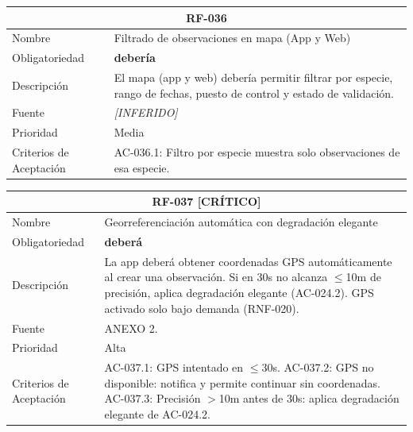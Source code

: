 \documentclass[12pt, a4paper]{article}
\newcommand{\criticomark}{\textcolor{criticolor}{\textbf{[CR\'ITICO]}}}
\newcommand{\inferido}{\textcolor{medio}{\textit{[INFERIDO]}}}
\begin{document}
\begin{longtable}{|p{3cm}|p{11.5cm}|}
\hline
\multicolumn{2}{|c|}{\textbf{RF-036}} \\
\hline
Nombre & Filtrado de observaciones en mapa (App y Web) \\
\hline
Obligatoriedad & \textbf{deber\'ia} \\
\hline
Descripci\'on & El mapa (app y web) deber\'ia permitir filtrar por especie, rango de fechas, puesto de control y estado de validaci\'on. \\
\hline
Fuente & \inferido{} \\
\hline
Prioridad & Media \\
\hline
Criterios de Aceptaci\'on &
AC-036.1: Filtro por especie muestra solo observaciones de esa especie. \\
\hline
\end{longtable}

\begin{longtable}{|p{3cm}|p{11.5cm}|}
\hline
\multicolumn{2}{|c|}{\textbf{RF-037} \criticomark} \\
\hline
Nombre & Georreferenciaci\'on autom\'atica con degradaci\'on elegante \\
\hline
Obligatoriedad & \textbf{deber\'a} \\
\hline
Descripci\'on & La app deber\'a obtener coordenadas GPS autom\'aticamente al crear una observaci\'on. Si en 30s no alcanza $\leq$10m de precisi\'on, aplica degradaci\'on elegante (AC-024.2). GPS activado solo bajo demanda (RNF-020). \\
\hline
Fuente & ANEXO 2. \\
\hline
Prioridad & Alta \\
\hline
Criterios de Aceptaci\'on &
AC-037.1: GPS intentado en $\leq$30s. \newline
AC-037.2: GPS no disponible: notifica y permite continuar sin coordenadas. \newline
AC-037.3: Precisi\'on $>$10m antes de 30s: aplica degradaci\'on elegante de AC-024.2. \\
\hline
\end{longtable}
\end{document}
